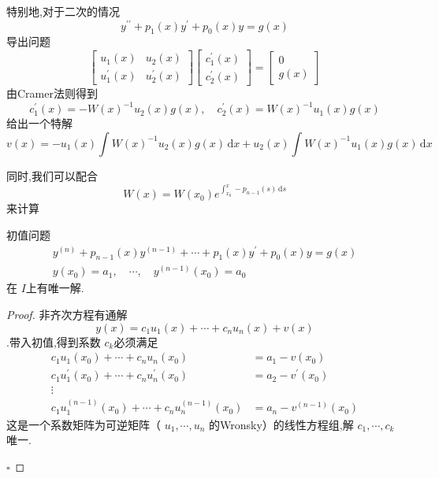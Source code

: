 \documentclass[lang=cn,12pt,color=green,fontset=none]{elegantbook}
\begin{document}
\begin{example}特别地,对于二次的情况 \[
y^{\prime \prime} + p_1\left( x \right)y^{\prime} + p_0\left( x \right)y=g\left( x \right)   
\]导出问题   \[
\begin{bmatrix} 
    u_1\left( x \right)&u_2\left( x \right)\\ 
     u_1^{\prime} \left( x \right)&u_2^{\prime} \left( x \right)     
\end{bmatrix} \begin{bmatrix} 
    c_1^{\prime} \left( x \right)\\ 
     c_2^{\prime} \left( x \right)   
\end{bmatrix} = \begin{bmatrix} 
    0\\ 
     g\left( x \right)  
\end{bmatrix}   
\] 由Cramer法则得到 \[
c_1^{\prime} \left( x \right)=-W\left( x \right)^{-1} u_2\left( x \right)g\left( x \right),\quad  c_2^{\prime} \left( x \right) = W\left( x \right)^{-1} u_1\left( x \right)g\left( x \right)        
\]给出一个特解 \[
v\left( x \right)=-u_1\left( x \right)\int W\left( x \right)^{-1} u_2\left( x \right)g\left( x \right)\,\mathrm{d} x+ u_2\left( x \right) \int W\left( x \right)^{-1} u_1\left( x \right)g\left( x \right)\,\mathrm{d} x         
\]

同时,我们可以配合 \[
W\left( x \right)= W\left( x_0 \right)e^{\int_{x_0}^{x}-p_{n-1}\left( s \right)\,\mathrm{d} s }  
\]来计算
\end{example}
\begin{proposition}
    初值问题 \[
    \begin{aligned}
    y^{\left( n \right) }+ p_{n-1}\left( x \right)y^{\left( n-1 \right) }+ \cdots + p_1\left( x \right)y^{\prime} + p_0\left( x \right)y=g\left( x \right)\\ 
     y\left( x_0 \right)=a_1,\quad \cdots ,\quad y^{\left( n-1 \right) }\left( x_0 \right)       =a_0
    \end{aligned}
    \]在 \(  I  \)上有唯一解. 
\end{proposition}

\begin{proof}
    非齐次方程有通解 \[
    y\left( x \right)=c_1u_1\left( x \right)+ \cdots + c_{n}u_{n}\left( x \right)+ v\left( x \right)    
    \].带入初值,得到系数 \(  c_{k}  \)必须满足 \[
    \begin{aligned}
    c_1u_1\left( x_0 \right)+ \cdots + c_{n}u_{n}\left( x_0 \right)&=a_1-v\left( x_0 \right)\\ 
    c_1u_1^{\prime} \left( x_0 \right)+ \cdots + c_{n}u_{n}^{\prime} \left( x_0 \right)& =a_2-v^{\prime} \left( x_0 \right)\\ 
     \vdots\\ 
      c_1u_1^{\left( n-1 \right) }\left( x_0 \right)+ \cdots + c_{n}u_{n}^{\left( n-1 \right) }\left( x_0 \right)& = a_{n}-v^{\left( n-1 \right) }\left( x_0 \right)      
    \end{aligned}
    \] 这是一个系数矩阵为可逆矩阵（ \(   u_1,\cdots,u_n   \) 的Wronsky）的线性方程组,解 \(   c_1,\cdots,c_k   \)唯一. 

    \hfill $\square$
\end{proof}
\end{document}
